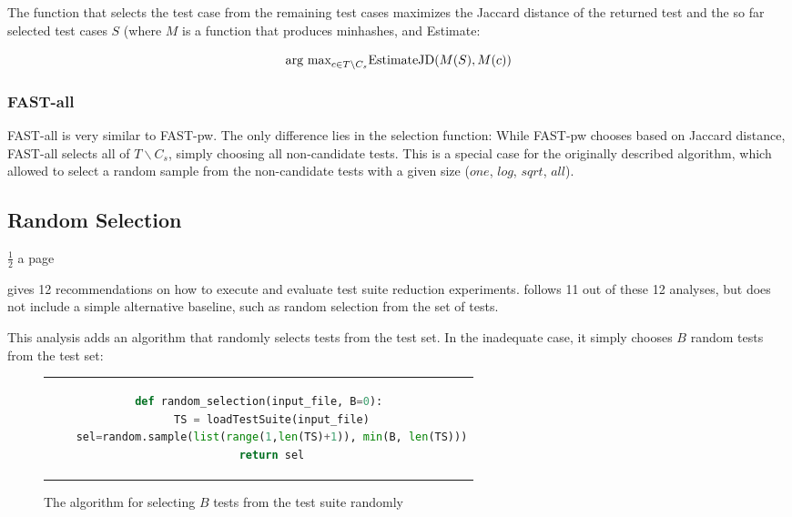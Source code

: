 
The function that selects the test case from the remaining test cases
maximizes the Jaccard distance of the returned test and the so far
selected test cases $S$ (where $M$ is a function that produces minhashes, and Estimate:

$$ \hbox{arg max}_{c \in T \backslash C_s} \hbox{EstimateJD}(M(S), M(c))$$

\subsubsection{FAST-all}

FAST-all is very similar to FAST-pw. The only difference lies in the
selection function: While FAST-pw chooses based on Jaccard distance,
FAST-all selects all of $T \backslash C_s$, simply choosing all
non-candidate tests. This is a special case for the originally described
algorithm, which allowed to select a random sample from the non-candidate
tests with a given size ($one$, $log$, $sqrt$, $all$).

\subsection{Random Selection}

$\frac{1}{2}$ a page

\cite{khan2018systematic} gives 12 recommendations on how to execute and
evaluate test suite reduction experiments. \cite{cruciani2019scalable}
follows 11 out of these 12 analyses, but does not include a simple
alternative baseline, such as random selection from the set of tests.

This analysis adds an algorithm that randomly selects tests from the test
set.
In the inadequate case, it simply chooses $B$ random tests from the
test set:


\begin{figure}[htpb]
\centering
\begin{tabular}{c}
\begin{lstlisting}[language=python]
def random_selection(input_file, B=0):
	TS = loadTestSuite(input_file)
	sel=random.sample(list(range(1,len(TS)+1)), min(B, len(TS)))
	return sel
\end{lstlisting}
\end{tabular}
\caption[Random budget selection]{The algorithm for selecting $B$ tests from the test suite randomly}\label{fig:random-budget-listing}
\end{figure}

